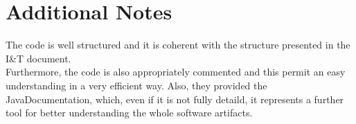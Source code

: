 \chapter{Additional Notes}

The code is well structured and it is coherent with the structure presented in the I\&T document. \\ 
Furthermore, the code is also appropriately commented and this permit an easy understanding in a very efficient way. Also, they provided the JavaDocumentation, which, even if it is not fully detaild, it represents a 
further tool for better understanding the whole software artifacts.
 